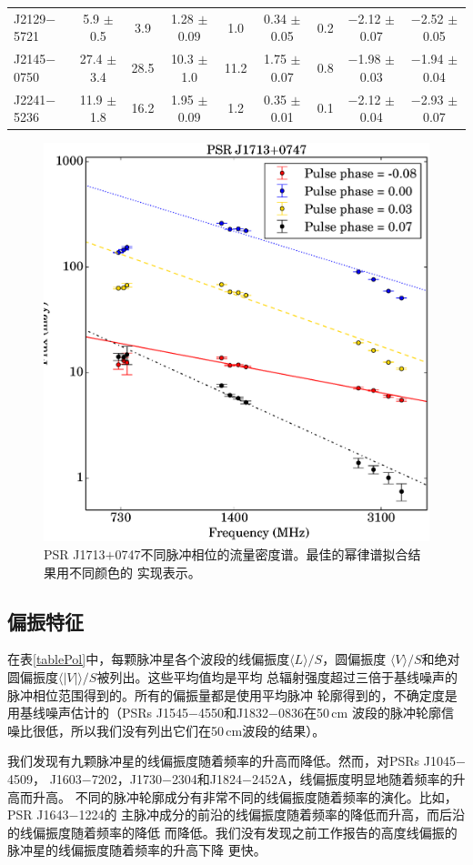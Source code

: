 \begin{landscape}
\begin{table}
\begin{tabular}{lcccccccc}
 J2129$-$5721  &  5.9   $\pm$ 0.5  &  3.9   &  1.28  $\pm$ 0.09 &  1.0  &  0.34 $\pm$ 0.05 &  0.2   &  $-$2.12 $\pm$ 0.07 &  $-$2.52 $\pm$ 0.05 \\ 
 J2145$-$0750  &  27.4  $\pm$ 3.4  &  28.5  &  10.3  $\pm$ 1.0  &  11.2 &  1.75 $\pm$ 0.07 &  0.8   &  $-$1.98 $\pm$ 0.03 &  $-$1.94 $\pm$ 0.04 \\ 
 J2241$-$5236  &  11.9  $\pm$ 1.8  &  16.2  &  1.95  $\pm$ 0.09 &  1.2  &  0.35 $\pm$ 0.01 &  0.1   &  $-$2.12 $\pm$ 0.04 &  $-$2.93 $\pm$ 0.07 \\ 
\hline
\end{tabular}
\end{table}
\end{landscape}

\begin{figure}
\begin{center}
\includegraphics[width=3 in]{1713phaseSI.ps}
\caption{PSR J1713$+$0747不同脉冲相位的流量密度谱。最佳的幂律谱拟合结果用不同颜色的
实现表示。} 
\label{1713SI}
\end{center}
\end{figure}

\subsection{偏振特征}

在表\ref{tablePol}中，每颗脉冲星各个波段的线偏振度$\langle L \rangle/S$，圆偏振度
$\langle V \rangle/S$和绝对圆偏振度$\langle|V|\rangle/S$被列出。这些平均值均是平均
总辐射强度超过三倍于基线噪声的脉冲相位范围得到的。所有的偏振量都是使用平均脉冲
轮廓得到的，不确定度是用基线噪声估计的（PSRs J1545$-$4550和J1832$-$0836在50\,cm
波段的脉冲轮廓信噪比很低，所以我们没有列出它们在50\,cm波段的结果）。

我们发现有九颗脉冲星的线偏振度随着频率的升高而降低。然而，对PSRs J1045$-$4509，
J1603$-$7202，J1730$-$2304和J1824$-$2452A，线偏振度明显地随着频率的升高而升高。
不同的脉冲轮廓成分有非常不同的线偏振度随着频率的演化。比如，PSR J1643$-$1224的
主脉冲成分的前沿的线偏振度随着频率的降低而升高，而后沿的线偏振度随着频率的降低
而降低。我们没有发现之前工作报告的高度线偏振的脉冲星的线偏振度随着频率的升高下降
更快\supercite{Kramer99}。

